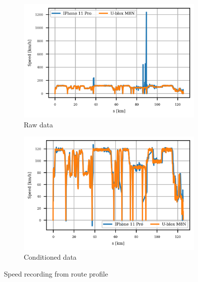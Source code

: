 \documentclass{article}
\begin{document}
			\begin{figure}[h]
		   		\centering
		     	\begin{subfigure}[b]{0.45\textwidth}
		      		\centering
		      	  	\includegraphics[width=\textwidth]{Route/raw_speed.png}
		      	  	\caption{Raw data}
		     	\end{subfigure}
		     	\begin{subfigure}[b]{0.45\textwidth}
		      	   \centering
		      	   \includegraphics[width=\textwidth]{Route/cond_speed.png}
		      	   \caption{Conditioned data}
		     	\end{subfigure}
			   \caption{Speed recording from route profile}
			   \label{fig:route_speed}
		   \end{figure}
\end{document}
